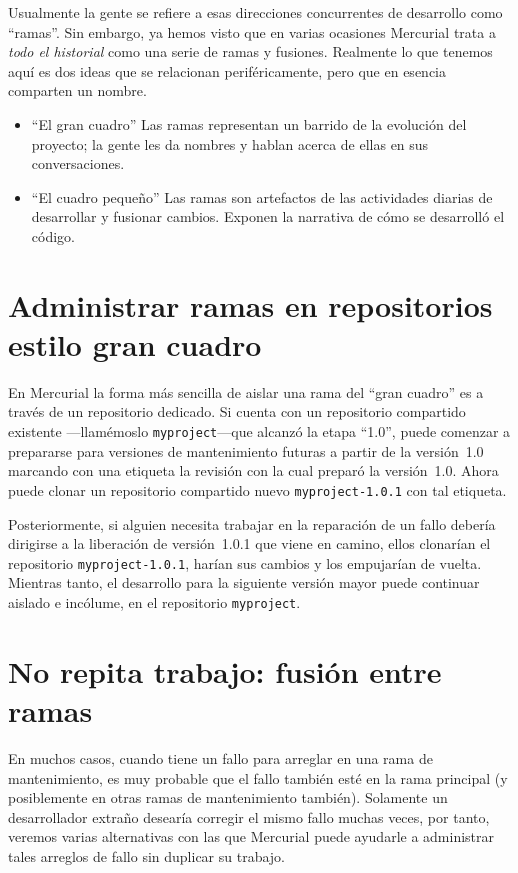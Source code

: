 Usualmente la gente se refiere a esas direcciones
concurrentes de desarrollo como ``ramas''.  Sin embargo, ya hemos visto que
en varias ocasiones Mercurial trata a \emph{todo el historial} como
una serie de ramas y fusiones.  Realmente lo que tenemos aquí es dos
ideas que se relacionan periféricamente, pero que en esencia comparten
un nombre.
\begin{itemize}
\item ``El gran cuadro'' Las ramas representan un barrido de la
  evolución del proyecto; la gente les da nombres y hablan acerca de
  ellas en sus conversaciones.
\item ``El cuadro pequeño'' Las ramas son artefactos de las
  actividades diarias de desarrollar y fusionar cambios. Exponen la
  narrativa de cómo se desarrolló el código.
\end{itemize}

\section{Administrar ramas en repositorios estilo gran cuadro}

En Mercurial la forma más sencilla de aislar una rama del ``gran
cuadro'' es a través de un repositorio dedicado.  Si cuenta con un
repositorio compartido existente ---llamémoslo
\texttt{myproject}---que alcanzó la etapa ``1.0'', puede comenzar a
prepararse para versiones de mantenimiento futuras a partir de la
versión~1.0 marcando con una etiqueta la revisión con la cual preparó la versión~1.0.
Ahora puede clonar un repositorio compartido nuevo
\texttt{myproject-1.0.1} con tal etiqueta.

Posteriormente, si alguien necesita trabajar en la reparación de un
fallo debería dirigirse a la liberación de versión~1.0.1 que viene en
camino, ellos clonarían el repositorio \texttt{myproject-1.0.1},
harían sus cambios y los empujarían de vuelta.
Mientras tanto, el desarrollo para la siguiente versión mayor puede
continuar aislado e incólume, en el repositorio \texttt{myproject}.

\section{No repita trabajo: fusión entre ramas}

En muchos casos, cuando tiene un fallo para arreglar en una rama de
mantenimiento, es muy probable que el fallo también esté en la rama
principal (y posiblemente en otras ramas de mantenimiento
también). Solamente un desarrollador extraño desearía corregir el
mismo fallo muchas veces, por tanto, veremos varias alternativas con
las que Mercurial puede ayudarle a administrar tales arreglos de fallo
sin duplicar su trabajo.

